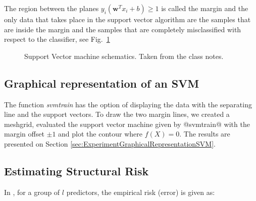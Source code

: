 \documentclass[letterpaper, 10 pt, conference]{ieeeconf}  %
\begin{document}
The region between the planes $y_{i}(\mathbf{w}^{T}x_{i} + b ) \geq 1 $ is called the margin and the only data that takes place in the support vector algorithm are
the samples that are inside the margin and the samples that are completely misclassified with respect to the classifier, see Fig.~\ref{fig:SupportVectorImage}

\begin{figure}[thpb]
      \centering
      \caption{Support Vector machine schematics. Taken from the class notes. }
      \label{fig:SupportVectorImage}
\end{figure}


\subsection{Graphical representation of an SVM}
\label{sec:TheoryGraphicalRepresentationSVM}

The function \emph{svmtrain} has the option of displaying the data with the separating line and the support vectors. To draw 
the two margin lines, we created a meshgrid, evaluated the support vector machine given by @svmtrain@ with the margin 
offset $\pm1$ and plot the contour where $f(X) = 0$. The results are presented on Section \ref{sec:ExperimentGraphicalRepresentationSVM}.

 \subsection{Estimating Structural Risk}
 \label{sec:TheoryEstimatingStructuralRisk}
 
 In \cite{Burges1998}, for a group of $l$ predictors, the empirical risk (error) is given as:
 
\end{document}
